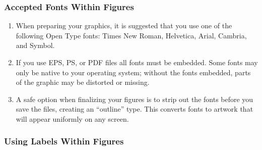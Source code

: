 \subsubsection{Accepted Fonts Within Figures}

\begin{enumerate}
	\item When preparing your graphics, it is suggested that you use one of the following Open Type fonts: Times New Roman, Helvetica, Arial, Cambria, and Symbol.

	\item If you use EPS, PS, or PDF files all fonts must be embedded. Some fonts may only be native to your operating system; without the fonts embedded, parts of the graphic may be distorted or missing.
	
	\item A safe option when finalizing your figures is to strip out the fonts before you save the files, creating an “outline” type. This converts fonts to artwork that will appear uniformly on any screen.

\end{enumerate}



\subsubsection{Using Labels Within Figures}

